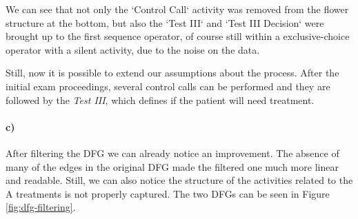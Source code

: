 \documentclass[12pt]{report}
\begin{document}
We can see that not only the `Control Call` activity was removed from the flower structure at the bottom, but also the `Test III` and `Test III Decision` were brought up to the first sequence operator, of course still within a exclusive-choice operator with a silent activity, due to the noise on the data.

Still, now it is possible to extend our assumptions about the process. After the initial exam proceedings, several control calls can be performed and they are followed by the \emph{Test III}, which defines if the patient will need treatment.

\paragraph{c)} 

After filtering the DFG we can already notice an improvement. The absence of many of the edges in the original DFG made the filtered one much more linear and readable. Still, we can also notice the structure of the activities related to the A treatments is not properly captured. The two DFGs can be seen in Figure \ref{fig:dfg-filtering}.
\end{document}
